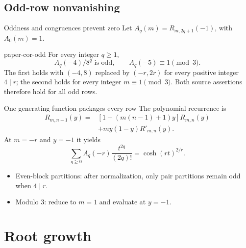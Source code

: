 \documentclass{beamer}
\begin{document}
\subsection{Odd-row nonvanishing}
\begin{frame}{Oddness and congruences prevent zero}
Let $A_q(m)=R_{m,2q+1}(-1)$, with $A_0(m)=1$.
\begin{bookresult}{paper-cor-odd}
For every integer $q\geq1$,
\[
A_q(-4)/8^q\text{ is odd},\qquad A_q(-5)\equiv1\pmod3.
\]
The first holds with $(-4,8)$ replaced by $(-r,2r)$ for every positive integer $4\mid r$; the second holds for every integer $m\equiv1\pmod3$.
Both source assertions therefore hold for all odd rows.
\end{bookresult}
\end{frame}
\begin{frame}{One generating function packages every row}
The polynomial recurrence is
\begin{align*}
R_{m,n+1}(y)={}&[1+(m(n-1)+1)y]R_{m,n}(y)\\
&+my(1-y)R'_{m,n}(y).
\end{align*}
At $m=-r$ and $y=-1$ it yields
\[
\sum_{q\geq0} A_q(-r)\frac{t^{2q}}{(2q)!}=\cosh(rt)^{2/r}.
\]
\begin{itemize}
\item Even-block partitions: after normalization, only pair partitions remain odd when $4\mid r$.
\item Modulo 3: reduce to $m=1$ and evaluate at $y=-1$.
\end{itemize}
\end{frame}
\section[Roots]{Root growth}
\end{document}
